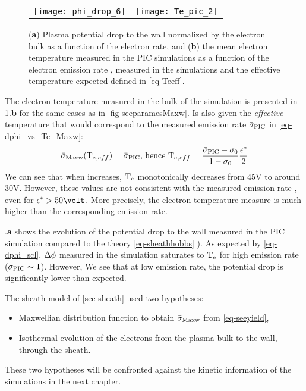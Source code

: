   \begin{figure}[hbtp]
    \centering
    \begin{tabular}{cc}
      \texttt{[image: phi\_drop\_6]}
      &
      \texttt{[image: Te\_pic\_2]}
    \end{tabular}
    \caption{({\bf a}) Plasma potential drop to the wall normalized by the electron bulk as a function of the electron rate, and ({\bf b}) the mean electron temperature measured in the \ac{PIC} simulations as a function of the electron emission rate \rate, measured in the simulations and the effective temperature expected defined in \cref{eq-Teeff}.  }
    \label{fig-Tevsproba}
  \end{figure}
  
  The electron temperature measured in the bulk of the simulation is presented in \cref{fig-Tevsproba}.{\bf b} for the same cases as in \cref{fig-seeparamesMaxw}.
  Is also given the \emph{effective} temperature that would correspond to the measured emission rate $ \bar{\sigma }_{\rm PIC}$ in \cref{eq-dphi_vs_Te_Maxw}\string:
  \begin{equation} \label{eq-Teeff}
      \bar{\sigma }_{\rm Maxw}(\mathrm{T_e}{}_{, eff}) =  \bar{\sigma }_{\rm PIC} \text{, hence } \mathrm{T_e}{}_{, eff} = \frac{ \bar{\sigma }_{\rm PIC} - \sigma_0}{1 - \sigma_0} \frac{\epsilon^{*}}{2}
  \end{equation}
  We can see that when \rate increases, $\mathrm{T_e}$ monotonically decreases from 45V to around 30V.
  However, these values are not consistent with the measured emission rate \ratepic, even for $\crover > 50\volt$.
  More precisely, the electron temperature measure is much higher than the corresponding emission rate.

  .{\bf a} shows the evolution of the potential drop to the wall measured in the \ac{PIC} simulation compared to the theory  \cref{eq-sheathhobbs} ).
  As expected by \cref{eq-dphi_scl}, $\Delta \phi$ measured in the simulation saturates to $\mathrm{T_e}$ for high emission rate ($ \bar{\sigma }_{\rm PIC} \sim 1$).
  However, 
  We see that at low emission rate, the potential drop is significantly lower than expected.
  
  The sheath model of \cref{sec-sheath} used two hypotheses\string:
  \begin{itemize}
    \item Maxwellian distribution function to obtain $ \bar{\sigma }_{\rm Maxw}$ from \cref{eq-seeyield},
    \item Isothermal evolution of the electrons from the plasma bulk to the wall, through the sheath.
  \end{itemize}
  These two hypotheses will be confronted against the kinetic information of the simulations in the next chapter.
